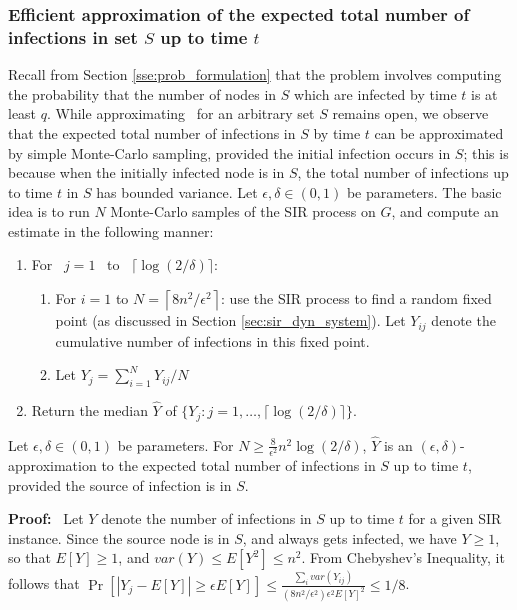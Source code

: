 \subsubsection{Efficient approximation of the expected total number of infections
in set $S$ up to time $t$}

Recall from Section \ref{sse:prob_formulation} that the \tTotInfs{} problem
involves computing the probability that the number of nodes
in $S$ which are infected by time $t$ is at least $q$. While approximating
\tTotInfs{} ~for an arbitrary set $S$ remains open, we observe that the expected 
total number of infections in $S$
by time $t$ can be approximated by 
simple Monte-Carlo sampling, provided the initial infection occurs in $S$;
this is because when the initially infected node is in $S$,
the total number of infections up to time $t$ in $S$ has bounded variance.  Let
$\epsilon, \delta\in (0,1)$ be parameters.  The basic idea 
is to run $N$ Monte-Carlo
samples of the SIR process on $G$, and compute an estimate in the
following manner:

\begin{enumerate}
\item
For~ $j=1$ ~to ~$\lceil \log{(2/\delta)} \rceil$:
\begin{enumerate}
\item
For $i=1$ to $N=\left\lceil 8n^2/\epsilon^2\right\rceil$: 
use the SIR process to 
find a random fixed point (as discussed in Section \ref{sec:sir_dyn_system}).
Let $Y_{ij}$ denote the cumulative number of infections
in this fixed point.
\item
Let $Y_j =\sum_{i=1}^N Y_{ij}/N$
\end{enumerate}
\item
Return the median $\hat{Y}$ of $\{Y_j: j=1,\ldots,\lceil\log{(2/\delta)}\rceil\}$.
\end{enumerate}


\begin{lemma}
\label{lemma:mcmc-numinf}
Let $\epsilon, \delta\in (0,1)$ be parameters.
For $N\geq \frac{8}{\epsilon^2}n^2\log{(2/\delta)}$, $\hat{Y}$ is
an $(\epsilon, \delta)$-approximation to the
expected total number of infections in $S$ up to time $t$, provided the source of
infection is in $S$.
\end{lemma}
\noindent
\textbf{Proof:}~
Let $Y$ denote the number of infections in $S$ up to time $t$ for a given SIR instance.
Since the source node is in $S$, and always gets infected, we have $Y\geq 1$, so
that $E[Y]\geq 1$, and $var(Y)\leq E[Y^2]\leq n^2$.
From Chebyshev's Inequality, it follows that 
$\Pr[|Y_j - E[Y] | \geq \epsilon E[Y]]\leq 
\frac{\sum_i var(Y_{ij})}{(8n^2/\epsilon^2)\epsilon^2E[Y]^2} \leq 1/8$.

